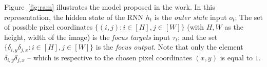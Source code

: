 \documentclass[11pt]{article}
\begin{document}
Figure~\ref{fig:ram} illustrates the model proposed in the work.
In this representation, the hidden state of the RNN $h_t$ is the \emph{outer state} input $o_t$;
The set of possible pixel coordinates $\{(i, j): i \in [H], j \in [W]\}$ (with $H, W$ as the height, width of the image)
is the \emph{focus targets} input $\tau_t$;
and the set $\{\delta_{i, y}\delta_{j, x}: i \in [H], j \in [W]\}$ is the \emph{focus output}.
Note that only the element $\delta_{i, y}\delta_{j,x}$ -- which is respective to the chosen pixel coordinates $(x, y)$
is equal to $1$.


\printbibliography
\end{document}
